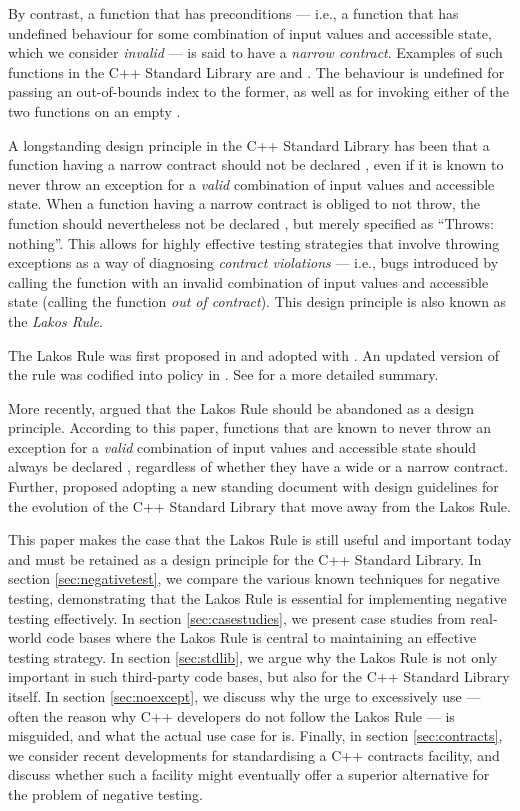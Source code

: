 By contrast, a function that has preconditions --- i.e., a function that has undefined behaviour for some combination of input values and accessible state, which we consider \emph{invalid} --- is said to have a \emph{narrow contract}. Examples of such functions in the C++ Standard Library are  and . The behaviour is undefined for passing an out-of-bounds index to the former, as well as for invoking either of the two functions on an empty .

A longstanding design principle in the C++ Standard Library has been that a function having a narrow contract should not be declared , even if it is known to never throw an exception for a \emph{valid} combination of input values and accessible state. When a function having a narrow contract is obliged to not throw, the function should nevertheless not be declared , but merely specified as ``Throws: nothing''. This allows for highly effective testing strategies that involve throwing exceptions as a way of diagnosing \emph{contract violations} --- i.e., bugs introduced by calling the function with an invalid combination of input values and accessible state (calling the function \emph{out of contract}). This design principle is also known as the \emph{Lakos Rule}.

The Lakos Rule was first proposed in \cite{N3248} and adopted with \cite{N3279}. An updated version of the rule was codified into policy in \cite{P0884R0}. See \cite{O'Dwyer2018} for a more detailed summary.

More recently, \cite{P1656R2} argued that the Lakos Rule should be abandoned as a design principle. According to this paper, functions that are known to never throw an exception for a \emph{valid} combination of input values and accessible state should always be declared , regardless of whether they have a wide or a narrow contract. Further, \cite{P2148R0} proposed adopting a new standing document with design guidelines for the evolution of the C++ Standard Library that move away from the Lakos Rule.

This paper makes the case that the Lakos Rule is still useful and important today and must be retained as a design principle for the C++ Standard Library. In section \ref{sec:negativetest}, we compare the various known techniques for negative testing, demonstrating that the Lakos Rule is essential for implementing negative testing effectively. In section \ref{sec:casestudies}, we present case studies from real-world code bases where the Lakos Rule is central to maintaining an effective testing strategy. In section \ref{sec:stdlib}, we argue why the Lakos Rule is not only important in such third-party code bases, but also for the C++ Standard Library itself. In section \ref{sec:noexcept}, we discuss why the urge to excessively use  --- often the reason why C++ developers do not follow the Lakos Rule --- is misguided, and what the actual use case for  is. Finally, in section \ref{sec:contracts}, we consider recent developments for standardising a C++ contracts facility, and discuss whether such a facility might eventually offer a superior alternative for the problem of negative testing.

